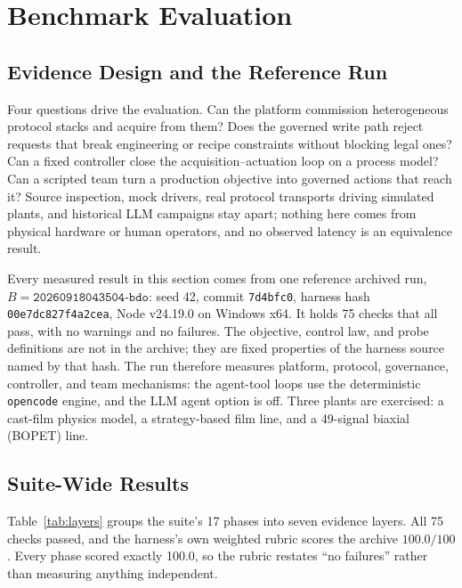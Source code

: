 \section{Benchmark Evaluation}
\label{sec:eval}

\subsection{Evidence Design and the Reference Run}
\label{sec:protocol}
\label{sec:static}
Four questions drive the evaluation. Can the platform commission heterogeneous
protocol stacks and acquire from them? Does the governed write path reject requests
that break engineering or recipe constraints without blocking legal ones? Can a
fixed controller close the acquisition--actuation loop on a process model? Can a
scripted team turn a production objective into governed actions that reach it?
Source
inspection, mock drivers, real protocol transports driving simulated plants, and
historical LLM campaigns stay apart; nothing here comes from physical hardware or
human operators, and no observed latency is an equivalence result.

Every measured result in this section comes from one reference archived run,
$B=\texttt{20260918043504-bdo}$: seed 42, commit \texttt{7d4bfc0}, harness hash
\texttt{00e7dc827f4a2cea}, Node v24.19.0 on Windows x64. It holds 75 checks that all
pass, with no warnings and no failures. The objective, control law, and probe
definitions are not in the archive; they are fixed properties of the harness source
named by that hash. The run therefore measures platform, protocol, governance,
controller, and team mechanisms: the agent-tool loops use the deterministic
\texttt{opencode} engine, and the LLM agent option is off. Three plants are exercised: a
cast-film physics model, a strategy-based film line, and a 49-signal biaxial (BOPET)
line.

\subsection{Suite-Wide Results}
\label{sec:suite}
Table~\ref{tab:layers} groups the suite's 17 phases into seven evidence layers.
All 75 checks passed, and the harness's own weighted rubric scores the archive
$100.0/100$. Every phase scored exactly 100.0, so the rubric restates ``no
failures'' rather than measuring anything independent.

